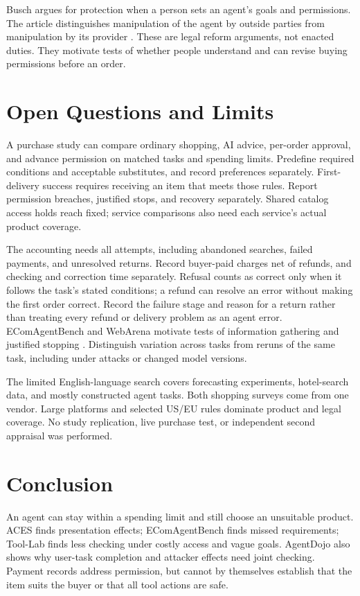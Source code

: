 \documentclass{article}
\begin{document}
Busch argues for protection when a person sets an agent's goals and permissions. The article distinguishes manipulation of the agent by outside parties from manipulation by its provider \cite{ref40}. These are legal reform arguments, not enacted duties. They motivate tests of whether people understand and can revise buying permissions before an order.

\section{Open Questions and Limits}

A purchase study can compare ordinary shopping, AI advice, per-order approval, and advance permission on matched tasks and spending limits. Predefine required conditions and acceptable substitutes, and record preferences separately. First-delivery success requires receiving an item that meets those rules. Report permission breaches, justified stops, and recovery separately. Shared catalog access holds reach fixed; service comparisons also need each service's actual product coverage.

The accounting needs all attempts, including abandoned searches, failed payments, and unresolved returns. Record buyer-paid charges net of refunds, and checking and correction time separately. Refusal counts as correct only when it follows the task's stated conditions; a refund can resolve an error without making the first order correct. Record the failure stage and reason for a return rather than treating every refund or delivery problem as an agent error. EComAgentBench and WebArena motivate tests of information gathering and justified stopping \cite{ref18,ref34}. Distinguish variation across tasks from reruns of the same task, including under attacks or changed model versions.

The limited English-language search covers forecasting experiments, hotel-search data, and mostly constructed agent tasks. Both shopping surveys come from one vendor. Large platforms and selected US/EU rules dominate product and legal coverage. No study replication, live purchase test, or independent second appraisal was performed.

\section{Conclusion}

An agent can stay within a spending limit and still choose an unsuitable product. ACES finds presentation effects; EComAgentBench finds missed requirements; Tool-Lab finds less checking under costly access and vague goals. AgentDojo also shows why user-task completion and attacker effects need joint checking. Payment records address permission, but cannot by themselves establish that the item suits the buyer or that all tool actions are safe.
\end{document}
